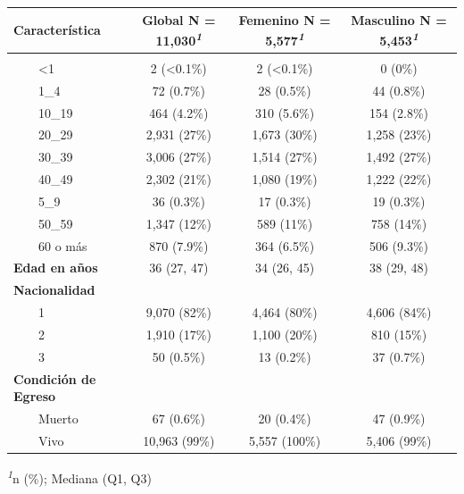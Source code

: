 \documentclass[
  letterpaper,
  DIV=11,
  numbers=noendperiod]{scrreprt}
\begin{document}
\begin{table}
\fontsize{12.0pt}{14.4pt}\selectfont
\begin{tabular*}{\linewidth}{@{\extracolsep{\fill}}lccc}
\toprule
\textbf{Característica} & \textbf{Global}  N = 11,030\textsuperscript{\textit{1}} & \textbf{Femenino}  N = 5,577\textsuperscript{\textit{1}} & \textbf{Masculino}  N = 5,453\textsuperscript{\textit{1}} \\ 
\midrule\addlinespace[2.5pt]
{\bfseries Grupo de edad en años} &  &  &  \\ 
    <1 & 2 (<0.1\%) & 2 (<0.1\%) & 0 (0\%) \\ 
    1\_4 & 72 (0.7\%) & 28 (0.5\%) & 44 (0.8\%) \\ 
    10\_19 & 464 (4.2\%) & 310 (5.6\%) & 154 (2.8\%) \\ 
    20\_29 & 2,931 (27\%) & 1,673 (30\%) & 1,258 (23\%) \\ 
    30\_39 & 3,006 (27\%) & 1,514 (27\%) & 1,492 (27\%) \\ 
    40\_49 & 2,302 (21\%) & 1,080 (19\%) & 1,222 (22\%) \\ 
    5\_9 & 36 (0.3\%) & 17 (0.3\%) & 19 (0.3\%) \\ 
    50\_59 & 1,347 (12\%) & 589 (11\%) & 758 (14\%) \\ 
    60 o más & 870 (7.9\%) & 364 (6.5\%) & 506 (9.3\%) \\ 
{\bfseries Edad en años} & 36 (27, 47) & 34 (26, 45) & 38 (29, 48) \\ 
{\bfseries Nacionalidad} &  &  &  \\ 
    1 & 9,070 (82\%) & 4,464 (80\%) & 4,606 (84\%) \\ 
    2 & 1,910 (17\%) & 1,100 (20\%) & 810 (15\%) \\ 
    3 & 50 (0.5\%) & 13 (0.2\%) & 37 (0.7\%) \\ 
{\bfseries Condición de Egreso} &  &  &  \\ 
    Muerto & 67 (0.6\%) & 20 (0.4\%) & 47 (0.9\%) \\ 
    Vivo & 10,963 (99\%) & 5,557 (100\%) & 5,406 (99\%) \\ 
\bottomrule
\end{tabular*}
\begin{minipage}{\linewidth}
\textsuperscript{\textit{1}}n (\%); Mediana (Q1, Q3)\\
\end{minipage}
\end{table}
\end{document}
